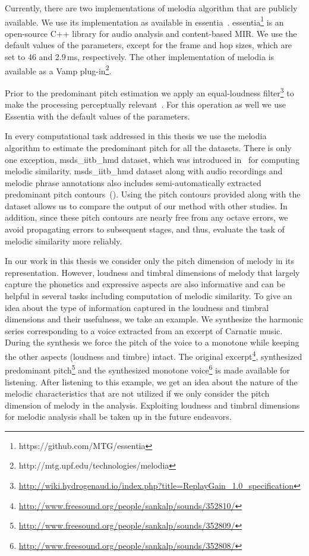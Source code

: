 {Currently, there are two implementations of \gls{melodia} algorithm that are publicly available. We use its implementation as available in \Gls{essentia}~\citep{essentia}. \Gls{essentia}\footnote{https://github.com/MTG/essentia} is an open-source C++ library for audio analysis and content-based MIR. We use the default values of the parameters, except for the frame and hop sizes, which are set to 46 and 2.9\,ms, respectively. The other implementation of \Gls{melodia} is available as a Vamp plug-in\footnote{http://mtg.upf.edu/technologies/melodia}. 

Prior to the predominant pitch estimation we apply an equal-loudness filter\footnote{\url{http://wiki.hydrogenaud.io/index.php?title=ReplayGain_1.0_specification}} to make the processing perceptually relevant~\citep{essentia}. For this operation as well we use Essentia with the default values of the parameters. 

In every computational task addressed in this thesis we use the \Gls{melodia} algorithm to estimate the predominant pitch for all the datasets. There is only one exception, \acrshort{msds_iitb_hmd} dataset, which was introduced in~\cite{Ross2012b} for computing melodic similarity. \acrshort{msds_iitb_hmd} dataset along with audio recordings and melodic phrase annotations also includes semi-automatically extracted predominant pitch contours~(). Using the pitch contours provided along with the dataset allows us to compare the output of our method with other studies. In addition, since these pitch contours are nearly free from any octave errors, we avoid propagating errors to subsequent stages, and thus, evaluate the task of melodic similarity more reliably. 

In our work in this thesis we consider only the pitch dimension of melody in its representation. However, loudness and timbral dimensions of melody that largely capture the phonetics and expressive aspects are also informative and can be helpful in several tasks including computation of melodic similarity. To give an idea about the type of information captured in the loudness and timbral dimensions and their usefulness, we take an example. We synthesize the harmonic series corresponding to a voice extracted from an excerpt of Carnatic music. During the synthesis we force the pitch of the voice to a monotone while keeping the other aspects (loudness and timbre) intact. The original excerpt\footnote{\url{http://www.freesound.org/people/sankalp/sounds/352810/}}, synthesized predominant pitch\footnote{\url{http://www.freesound.org/people/sankalp/sounds/352809/}} and the synthesized monotone voice\footnote{\url{http://www.freesound.org/people/sankalp/sounds/352808/}} is made available for listening. After listening to this example, we get an idea about the nature of the melodic characteristics that are not utilized if we only consider the pitch dimension of melody in the analysis. Exploiting loudness and timbral dimensions for melodic analysis shall be taken up in the future endeavors.


}
